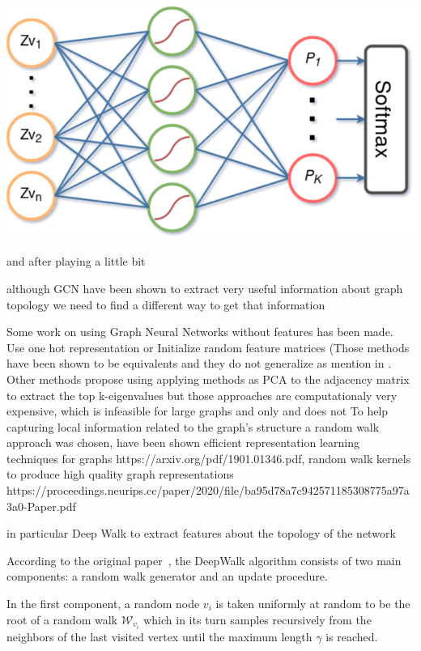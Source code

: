 \begin{center}
    \includegraphics[scale=0.5]{partitioning_module}
\end{center}

and after playing a little bit

although GCN have been shown to extract very useful information about graph topology we need to find a different way to get that information

Some work on using Graph Neural Networks without features has been made. Use one hot representation or Initialize random feature matrices (Those methods have been shown to be equivalents and they do not generalize as mention in \cite{hamilton}. Other methods propose using applying methods as PCA to the adjacency matrix to extract the top k-eigenvalues but those approaches are computationaly very expensive, which is infeasible for large graphs and only and does not
To help capturing local information related to the graph's structure a random walk approach was chosen, have been shown efficient representation learning techniques for graphs https://arxiv.org/pdf/1901.01346.pdf, random walk kernels to produce high quality graph representations https://proceedings.neurips.cc/paper/2020/file/ba95d78a7c942571185308775a97a3a0-Paper.pdf

in particular Deep Walk to extract features about the topology of the network

According to the original paper~\cite{deepwalk}, the DeepWalk algorithm consists of two main components: a random walk generator and an update procedure. 

In the first component, a random node $v_i$ is taken uniformly at random to be the root of a random walk $\mathcal W_{v_i}$ which in its turn samples recursively from the neighbors of the last visited vertex until the maximum length $\gamma$ is reached.

